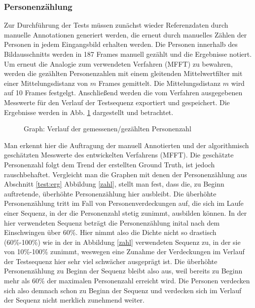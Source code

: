 \subsubsection{Personenzählung}
Zur Durchführung der Tests müssen zunächst wieder Referenzdaten durch manuelle Annotationen generiert werden, die erneut durch manuelles Zählen der Personen in jedem Eingangsbild erhalten werden. Die Personen innerhalb des Bildausschnitts werden in 187 Frames manuell gezählt und die Ergebnisse notiert. Um erneut die Analogie zum verwendeten Verfahren (MFFT) zu bewahren, werden die gezählten Personenzahlen mit einem gleitenden Mittelwertfilter mit einer Mittelungsdistanz von $m$ Frames gemittelt. Die Mittelungsdistanz $m$ wird auf 10 Frames festgelgt. Anschließend werden die vom Verfahren ausgegebenen Messwerte für den Verlauf der Testsequenz exportiert und gespeichert. Die Ergebnisse werden in Abb. \ref{business:zahl} dargestellt und betrachtet.
\newpage
\begin{figure}[h]
  \centering
  \caption{Graph: Verlauf der gemessenen/gezählten Personenzahl \cite{AliS07}}
  \label{business:zahl}
\end{figure}

Man erkennt hier die Auftragung der manuell Annotierten und der algorithmisch geschätzten Messwerte des entwickelten Verfahrens (MFFT). Die geschätzte Personenzahl folgt dem Trend der erstellten Ground Truth, ist jedoch rauschbehaftet. Vergleicht man die Graphen mit denen der Personenzählung aus Abschnitt \ref{test:erg} Abbildung \ref{zahl}, stellt man fest, dass die, zu Beginn auftretende, überhöhte Personenzählung hier ausbleibt. Die überhöhte Personenzählung tritt im Fall von Personenverdeckungen auf, die sich im Laufe einer Sequenz, in der die Personenzahl stetig zunimmt, ausbilden können. In der hier verwendeten Sequenz beträgt die Personenzählung inital nach dem Einschwingen über 60\%. Hier nimmt also die Dichte nicht so drastisch (60\%-100\%) wie in der in Abbildung \ref{zahl} verwendeten Sequenz zu, in der sie von 10\%-100\% zunimmt, weswegen eine Zunahme der Verdeckungen im Verlauf der Testsequenz hier sehr viel schwächer ausgeprägt ist. Die überhöhte Personenzählung zu Beginn der Sequenz bleibt also aus, weil bereits zu Beginn mehr als 60\% der maximalen Personenzahl erreicht wird. Die Personen verdecken sich also demnach schon zu Beginn der Sequenz und verdecken sich im Verlauf der Sequenz nicht merklich zunehmend weiter.

